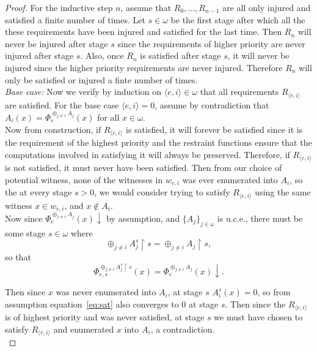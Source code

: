 \documentclass{article}
\begin{document}
\begin{proof}
    For the inductive step $n$, assume that $R_0,\ldots,R_{n-1}$ are
    all only injured and satisfied a finite number of times. Let
    $s\in\omega$ be the first stage after which all the these
    requirements have been injured and satisfied for the last time.
    Then $R_n$ will never be injured after stage $s$ since the
    requirements of higher priority are never injured after stage $s$.
    Also, once $R_n$ is satisfied after stage $s$, it will never be
    injured since the higher priority requirements are never injured.
    Therefore $R_n$ will only be satisfied or injured a finte number of
    times. \\

    \textit{Base case:} Now we verify by induction on $\langle
    e,i\rangle\in\omega$ that all requirements $R_{\langle e,i\rangle}$
    are satisfied. For the base case $\langle e,i\rangle=0$, assume by
    contradiction that $A_i(x)=\Phi_e^{\oplus_{j\neq i} A_j}(x)$ for
    all $x\in\omega$. \\

    Now from construction, if $R_{\langle e,i\rangle}$ is satisfied, it
    will forever be satisfied since it is the requirement of the
    highest priority and the restraint functions ensure that the
    computations involved in satisfying it will always be preserved.
    Therefore, if $R_{\langle e,i\rangle}$ is not satisfied, it must
    never have been satisfied. Then from our choice of potential
    witness, none of the witnesses in $w_{e,i}$ was ever enumerated
    into $A_i$, so the at every stage $s>0$, we would consider trying
    to satisfy $R_{\langle e,i\rangle}$ using the same witness $x\in
    w_{e,i}$, and $x\not\in A_i$. \\

    Now since $\Phi_e^{\oplus_{j\neq i} A_j}(x)\downarrow$ by
    assumption, and $\{A_j\}_{j\in\omega}$ is u.c.e., there must be
    some stage $s\in\omega$ where
    \[\oplus_{j\neq i} A_j^s \restriction s =\oplus_{j\neq i} A_j
    \restriction s,\]
    so that
    \begin{equation}
      \Phi_{e,s}^{\oplus_{j\neq i} A_j^s \restriction s}(x)
      =\Phi_e^{\oplus_{j\neq i} A_j}(x) \downarrow.
      \label{eq:sat}
    \end{equation}

    Then since $x$ was never enumerated into $A_i$, at stage $s$
    $A_i^s(x)=0$, so from assumption equation~\eqref{eq:sat} also
    converges to 0 at stage $s$. Then since the $R_{\langle
    e,i\rangle}$ is of highest priority and was never satisfied, at
    stage $s$ we must have chosen to satisfy $R_{\langle
    e,i\rangle}$ and enumerated $x$ into $A_i$, a contradiction. \\


\end{proof}
\end{document}
